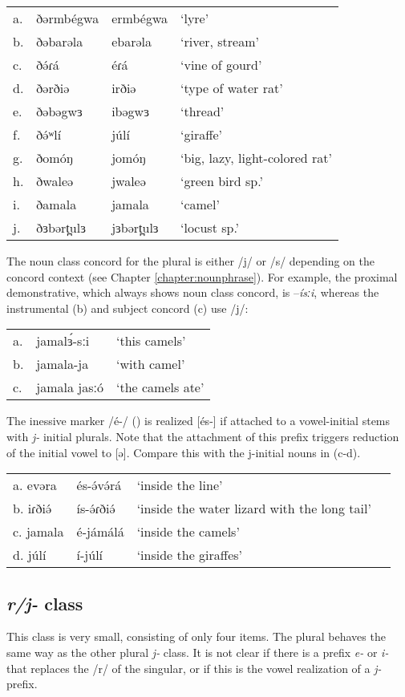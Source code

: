 \ea
\begin{tabular}[t]{llll}
a.	&	ðərmbégwa	&	ermbégwa		&	‘lyre’\\
b.	&	ðəbarəla	&	ebarəla		&	‘river, stream’\\
c.	&	ðə́ɾá			&	éɾá			&	‘vine of gourd’\\
d.	&	ðərðiə		&	irðiə		&	‘type of water rat’\\
e.	&	ðəbəgwɜ		&	ibəgwɜ		&	‘thread’\\
f.	&	ðə́ʷlí		&	júlí			&	‘giraffe’\\
g.	&	ðomóŋ		&	jomóŋ		&	‘big, lazy, light-colored rat’\\
h.	&	ðwaleə		&	jwaleə		&	‘green bird sp.’\\
i.	&	ðamala		&	jamala		&	‘camel’\\
j.	&	ðɜbərt̪ulɜ	&	jɜbərt̪ulɜ		&	‘locust sp.’ \\
\end{tabular}
\z

The noun class concord for the plural is either /j/ or /s/ depending on the concord context (see Chapter \ref{chapter:nounphrase}). For example, the proximal demonstrative, which always shows noun class concord, is –\textit{ísːi}, whereas the instrumental (b) and subject concord (c) use /j/:

\ea
\begin{tabular}[t]{lll}
	a.	&	jamalɜ́-sːi	&	‘this camels’\\
	b.	&	jamala-ja	&	‘with camel’\\
	c.	&	jamala jasːó&	‘the camels ate’\\
\end{tabular}
\z

The inessive marker /é-/ () is realized [és-] if attached to a vowel-initial stems with \textit{j-} initial plurals. Note that the attachment of this prefix triggers reduction of the initial vowel to [ə]. Compare this with the j-initial nouns in (c-d). 
\ea
\begin{tabular}[t]{llll}
a.	evəra	&	és-ə́və́rá	&‘inside the line’\\
b.	iɾðiə́	&	ís-ə́ɾðiə́	&‘inside the water lizard with the long tail’\\
c.	jamala	&	é-jámálá	&‘inside the camels’\\
d.	júlí	&	í-júlí	&‘inside the giraffes’	\\
\end{tabular}
\z


\subsection{\textit{r/j-} class}
This class is very small, consisting of only four items. The plural behaves the same way as the other plural \textit{j-} class. It is not clear if there is a prefix \textit{e-} or \textit{i-} that replaces the /r/ of the singular, or if this is the vowel realization of a \textit{j-} prefix. 

